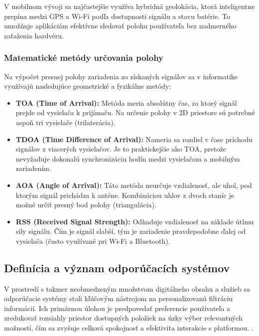 V mobilnom vývoji sa najčastejšie využíva hybridná geolokácia, ktorá inteligentne prepína medzi GPS a Wi-Fi podľa dostupnosti
signálu a stavu batérie. To umožňuje aplikáciám efektívne sledovať polohu používateľa bez nadmerného zaťaženia hardvéru.


\subsubsection{Matematické metódy určovania polohy}
Na výpočet presnej polohy zariadenia zo získaných signálov sa v informatike využívajú nasledujúce geometrické a fyzikálne metódy:

\begin{itemize}
    \item \textbf{TOA (Time of Arrival):} Metóda meria absolútny čas, za ktorý signál prejde od vysielača k prijímaču. Na určenie polohy v 2D priestore sú potrebné aspoň tri vysielače (trilaterácia).
    \item \textbf{TDOA (Time Difference of Arrival):} Nameria sa rozdiel v čase príchodu signálov z viacerých vysielačov. Je to praktickejšie ako TOA, pretože nevyžaduje dokonalú synchronizáciu hodín medzi vysielačom a mobilným zariadením.
    \item \textbf{AOA (Angle of Arrival):} Táto metóda neurčuje vzdialenosť, ale uhol, pod ktorým signál prichádza k anténe. Kombináciou uhlov z dvoch staníc je možné určiť presný bod polohy (triangulácia).
    \item \textbf{RSS (Received Signal Strength):} Odhaduje vzdialenosť na základe útlmu sily signálu. Čím je signál slabší, tým je zariadenie pravdepodobne ďalej od vysielača (často využívané pri Wi-Fi a Bluetooth).
\end{itemize} \cite{gentile2012geolocation}


\subsection{Definícia a význam odporúčacích systémov}
V prostredí s takmer neobmedzeným množstvom digitálneho obsahu 
a služieb sa odporúčacie systémy stali kľúčovým nástrojom na personalizovanú filtráciu informácií. 
Ich primárnou úlohou je predpovedať preferencie používateľa a 
zredukovať rozsiahly priestor dostupných položiek na úzky výber
relevantných možností, čím sa zvyšuje celková spokojnosť 
a efektivita interakcie s platformou. \cite{ko2022survey}.

